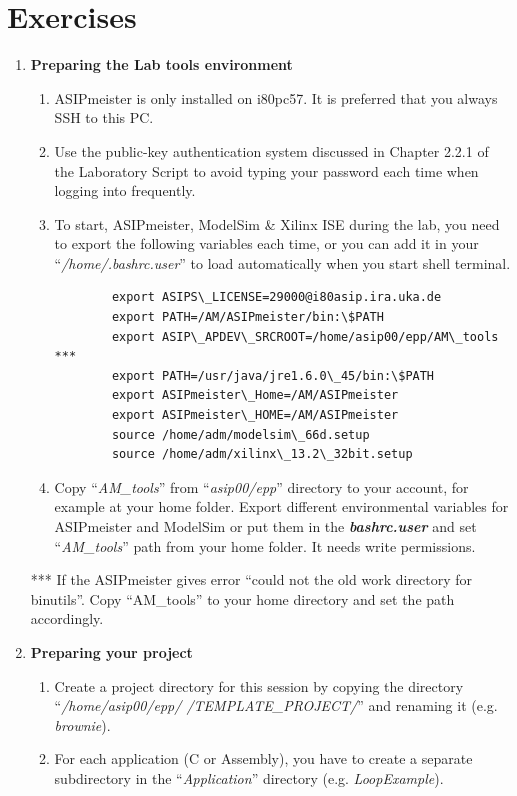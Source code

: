 \section*{Exercises}
\begin{enumerate}
\item \textbf{Preparing the Lab tools environment}
	\begin{enumerate}
	\item ASIPmeister is only installed on i80pc57. It is preferred that you always SSH to this PC.
	\item Use the public-key authentication system discussed in Chapter 2.2.1 of the Laboratory Script to avoid typing your password each time when logging into frequently.
	\item To start, ASIPmeister, ModelSim \& Xilinx ISE during the lab, you need to export the following variables each time, or you can add it in your ``\emph{/home/.bashrc.user}'' to load automatically when you start shell terminal.
	\begin{lstlisting}
		export ASIPS\_LICENSE=29000@i80asip.ira.uka.de
		export PATH=/AM/ASIPmeister/bin:\$PATH
		export ASIP\_APDEV\_SRCROOT=/home/asip00/epp/AM\_tools ***
		export PATH=/usr/java/jre1.6.0\_45/bin:\$PATH
		export ASIPmeister\_Home=/AM/ASIPmeister
		export ASIPmeister\_HOME=/AM/ASIPmeister
		source /home/adm/modelsim\_66d.setup
		source /home/adm/xilinx\_13.2\_32bit.setup
	\end{lstlisting}
	\item Copy ``\emph{AM\_tools}'' from ``\emph{asip00/epp}'' directory to your account, for example at your home folder. Export different environmental variables for ASIPmeister and ModelSim or put them in the \emph{\textbf{bashrc.user}} and set ``\emph{AM\_tools}'' path from your home folder. It needs write permissions.
	\end{enumerate}
*** If the ASIPmeister gives error ``could not the old work directory for binutils''. Copy ``AM\_tools'' to your home directory and set the path accordingly.
\item \textbf{Preparing your project}
	\begin{enumerate}
	\item Create a project directory for this session by copying the directory ``\emph{/home/asip00/­epp/ /TEMPLATE\_PROJECT/}'' and renaming it (e.g. \emph{brownie}).
	\item For each application (C or Assembly), you have to create a separate subdirectory in the ``\emph{Application}'' directory (e.g. \emph{LoopExample}).

\end{enumerate}
\end{enumerate}
